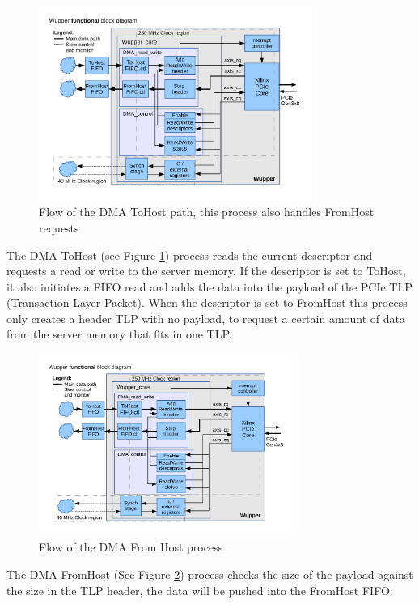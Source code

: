 \begin{figure}[H]
	\centering
\includegraphics[trim=0mm 1cm 0mm 0cm, width=0.80\textwidth, page=4]{figures/wupper_structure.pdf}
\caption{Flow of the DMA ToHost path, this process also handles FromHost requests}
\label{fig:flow_dma_tohost}
\end{figure}

The DMA ToHost (see Figure \ref{fig:flow_dma_tohost}) process reads the current descriptor and requests a read or write to the server memory. If the descriptor is set to ToHost, it also initiates a FIFO read and adds the data into the payload of the PCIe TLP (Transaction Layer Packet). When the descriptor is set to FromHost this process only creates a header TLP with no payload, to request a certain amount of data from the server memory that fits in one TLP.

\begin{figure}[H]
	\centering
	\includegraphics[trim=0mm 3cm 0mm 1cm, width=0.75\textwidth, page=5]{figures/wupper_structure.pdf}
	\caption{Flow of the DMA From Host process}
\label{fig:flow_dma_fromhost}
\end{figure}
The DMA FromHost (See Figure \ref{fig:flow_dma_fromhost}) process checks the size of the payload against the size in the TLP header, the data will be pushed into the FromHost FIFO.

